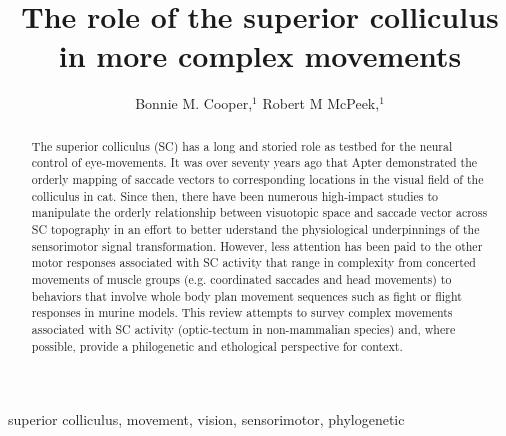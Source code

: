 \documentclass{ar-1col}
\begin{document}

\title{The role of the superior colliculus in more complex movements}


\author{Bonnie M. Cooper,$^1$ Robert M McPeek,$^1$
}

\begin{abstract}
The superior colliculus (SC) has a long and storied role as testbed for the neural control of eye-movements. It was over seventy years ago that Apter demonstrated the orderly mapping of saccade vectors to corresponding locations in the visual field of the colliculus in cat. Since then, there have been numerous high-impact studies to manipulate the orderly relationship between visuotopic space and saccade vector across SC topography in an effort to better uderstand the physiological underpinnings of the sensorimotor signal transformation. However, less attention has been paid to the other motor responses associated with SC activity that range in complexity from concerted movements of muscle groups (e.g. coordinated saccades and head movements) to behaviors that involve whole body plan movement sequences such as fight or flight responses in murine models. This review attempts to survey complex movements associated with SC activity (optic-tectum in non-mammalian species) and, where possible, provide a philogenetic and ethological perspective for context. 
\end{abstract}

\begin{keywords}
superior colliculus, movement, vision, sensorimotor, phylogenetic
\end{keywords}
\maketitle

\tableofcontents


\end{document}
